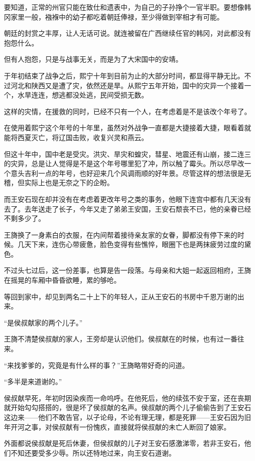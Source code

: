 要知道，正常的州官只能在致仕和遗表中，为自己的子孙挣个一官半职。要想像韩冈家里一般，襁褓中的幼子都吃着朝廷俸禄，至少得做到宰相才有可能。

朝廷的封赏之丰厚，让人无话可说。就连被留在广西继续任官的韩冈，对此都没有抱怨什么。

但有人抱怨，只是与战事无关，而是为了大宋国中的安靖。

于年初结束了战争之后，熙宁十年到目前为止的大部分时间，都显得平静无比。不过河北和陕西又是遭了灾，依然还是旱。从熙宁五年开始，国中的灾异一个接着一个，水旱连连，想逃都没处逃，民间受损无数。

这样的灾情，在援救的同时，已经不只有一个人，在考虑着是不是该改个年号了。

在使用着熙宁这个年号的十年里，虽然对外战争一直都是大捷接着大捷，眼看着就能将西夏灭亡，将辽国击败，收复兴灵和燕云。

但这十年中，国中老是受灾。洪灾、旱灾和蝗灾，彗星、地震还有山崩，接二连三的灾异，总是让人觉得是不是这个年号哪里犯了冲，所以触了霉头。所以尽早改一个意头吉利一点的年号，也好迎来几个风调雨顺的好年景。尽管这样的想法很是无稽，但实际上也是无奈之下的企盼。

而王安石现在却并没有在考虑着更改年号之类的事务，他眼下连宫中都有几天没有去了。去年送走了长子，今年又走了弟弟王安国，王安石颓丧不已，他的亲眷已经不剩多少了。

王旖换了一身素白的衣服，在内间帮着接待亲友家的女眷，脚都没有停下来的时候。几天下来，连伤心带疲惫，脸色变得有些憔悴，眼圈下也是两抹疲劳过度的黛色。

不过头七过后，这一份差事，也算是告一段落。与母亲和大姐一起返回相府，王旖在摇晃的车厢中昏昏欲睡，累的够呛。

等回到家中，却见到两名二十上下的年轻人，正从王安石的书房中千恩万谢的出来。

“是侯叔献家的两个儿子。”

王旖不清楚侯叔献的家人，王旁却是认识他们。侯叔献在的时候，也有过一番往来。

“来找爹爹的，究竟是有什么样的事？”王旖略带好奇的问道。

“多半是来道谢的。”

侯叔献早死，年初时因染疾而一命呜呼。在他死后，他的续弦不安于室，还在丧期就开始勾勾搭搭的，很是坏了侯叔献的名声。侯叔献的两个儿子偷偷告到了王安石这边来——他们不敢告官，以子论母，不论有理无理，都是死罪——王安石因为旧年开河之事，对侯叔献有一份愧疚，直接就将侯叔献的未亡人断回了娘家。

外面都说侯叔献是死后休妻，但侯叔献的儿子对王安石感激涕零，若非王安石，他们不知还要受多少辱。所以还特地过来，向王安石道谢。

